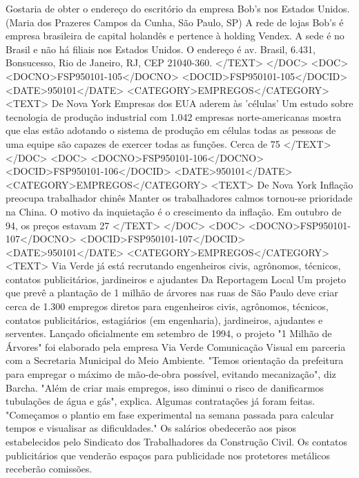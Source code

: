 Gostaria de obter o endereço do escritório da empresa Bob's nos Estados Unidos. (Maria dos Prazeres Campos da Cunha, São Paulo, SP)
A rede de lojas Bob's é empresa brasileira de capital holandês e pertence à holding Vendex. A sede é no Brasil e não há filiais nos Estados Unidos. O endereço é av. Brasil, 6.431, Bonsucesso, Rio de Janeiro, RJ, CEP 21040-360.
</TEXT>
</DOC>
<DOC>
<DOCNO>FSP950101-105</DOCNO>
<DOCID>FSP950101-105</DOCID>
<DATE>950101</DATE>
<CATEGORY>EMPREGOS</CATEGORY>
<TEXT>
De Nova York 
Empresas dos EUA aderem às 'células' 
Um estudo sobre tecnologia de produção industrial com 1.042 empresas norte-americanas mostra que elas estão adotando o sistema de produção em células todas as pessoas de uma equipe são capazes de exercer todas as funções. Cerca de 75%
</TEXT>
</DOC>
<DOC>
<DOCNO>FSP950101-106</DOCNO>
<DOCID>FSP950101-106</DOCID>
<DATE>950101</DATE>
<CATEGORY>EMPREGOS</CATEGORY>
<TEXT>
De Nova York 
Inflação preocupa trabalhador chinês 
Manter os trabalhadores calmos tornou-se prioridade na China. O motivo da inquietação é o crescimento da inflação. Em outubro de 94, os preços estavam 27%
</TEXT>
</DOC>
<DOC>
<DOCNO>FSP950101-107</DOCNO>
<DOCID>FSP950101-107</DOCID>
<DATE>950101</DATE>
<CATEGORY>EMPREGOS</CATEGORY>
<TEXT>
Via Verde já está recrutando engenheiros civis, agrônomos, técnicos, contatos publicitários, jardineiros e ajudantes 
Da Reportagem Local Um projeto que prevê a plantação de 1 milhão de árvores nas ruas de São Paulo deve criar cerca de 1.300 empregos diretos para engenheiros civis, agrônomos, técnicos, contatos publicitários, estagiários (em engenharia), jardineiros, ajudantes e serventes.
Lançado oficialmente em setembro de 1994, o projeto "1 Milhão de Árvores" foi elaborado pela empresa Via Verde Comunicação Visual em parceria com a Secretaria Municipal do Meio Ambiente.
"Temos orientação da prefeitura para empregar o máximo de mão-de-obra possível, evitando mecanização", diz Barcha. "Além de criar mais empregos, isso diminui o risco de danificarmos tubulações de água e gás", explica.
Algumas contratações já foram feitas. "Começamos o plantio em fase experimental na semana passada para calcular tempos e visualisar as dificuldades."
Os salários obedecerão aos pisos estabelecidos pelo Sindicato dos Trabalhadores da Construção Civil. Os contatos publicitários que venderão espaços para publicidade nos protetores metálicos receberão comissões.
